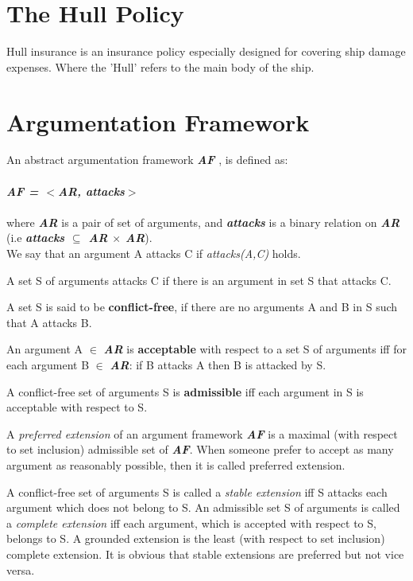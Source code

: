 \section{The Hull Policy}

Hull insurance is an insurance policy especially designed for covering ship damage expenses. Where the 'Hull' refers to the main body of the ship.

\section{Argumentation Framework}

An abstract argumentation framework \textbf{\textit{AF}} \cite{dung1995}, is defined as: \\
\\
\textit{\textbf{ AF = $<$AR, attacks$>$}}\\
\\
where \textbf{\textit{AR}} is a pair of set of arguments, and   \textit{\textbf{attacks}} is a binary relation on \textbf{\textit{AR}} (i.e  \textit{\textbf{ attacks $\subseteq$ AR $\times$ AR}}). \\

We say that an argument A attacks C if \textit{attacks(A,C)} holds.

 A set S of arguments attacks C if there is an argument in set S that attacks C.

 
 A set S is said to be \textbf{conflict-free}, if there are no arguments A and B in S such that A attacks B. 


 An argument A $\in$ \textbf{\textit{AR}} is \textbf{acceptable} with respect to a set S of arguments iff for each argument B $\in$ \textbf{\textit{AR}}: if B attacks A then B is attacked by S.
 

 A conflict-free set of arguments S is \textbf{admissible} iff each argument in S is acceptable with respect to S.

 A \textit{preferred extension} of an argument framework \textbf{\textit{AF}} is a maximal (with respect to set inclusion) admissible set of \textbf{\textit{AF}}. When someone prefer to accept as many argument as reasonably possible, then it is called preferred extension.

 A conflict-free set of arguments S is called a \textit{stable extension} iff S attacks each argument which does not belong to S. An admissible set S of arguments is called a \textit{complete extension} iff each argument, which is accepted with respect to S, belongs to S. A grounded extension is the least (with respect to set inclusion) complete extension. It is obvious that stable extensions are preferred but not vice versa.

\FloatBarrier

